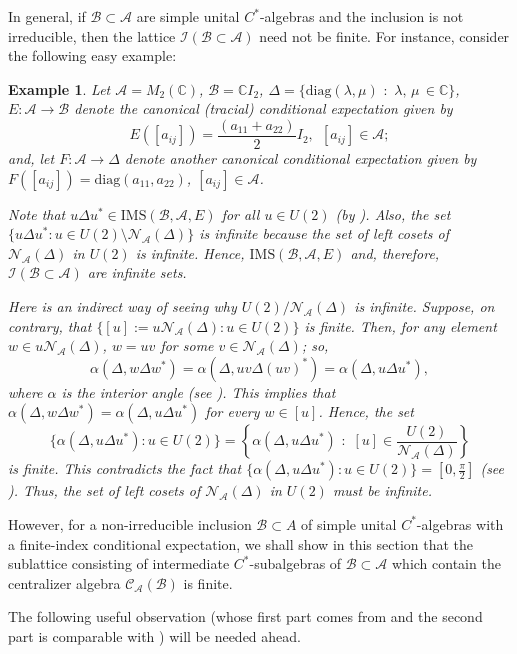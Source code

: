\documentclass{amsart}
\numberwithin{equation}{section}
\newcommand{\IMS}{\mathrm{IMS}}
\newcommand{\mcal}{\mathcal}
\newcommand{\mbb}{\mathbb}
\newcommand{\1}{\mathbf{1}}
\newcommand{\mA}{\mathcal{A}}
\newcommand{\mB}{\mathcal{B}}
\newcommand{\mC}{\mathcal{C}}
\newcommand{\mN}{\mathcal{N}}
\newtheorem{example}[theorem]{Example}
\begin{document}
In general, if $\mB \subset \mA$ are simple unital $C^*$-algebras and
the inclusion is not irreducible, then the lattice $\mathcal{I}(\mB
\subset \mA)$ need not be finite. For instance, consider the following
easy example:
\begin{example}
  Let $\mA=M_2(\mbb{C})$, $\mB=\mbb{C}I_2$, $\Delta=
  \{\mathrm{diag}(\lambda, \mu)\,\,:\,\,\lambda,\,\mu\,\in \mbb{C}\}$,
  $E: \mA\rightarrow \mB$ denote the canonical (tracial) conditional
  expectation given by
  \[
  E([a_{ij}])= \frac{(a_{11}+a_{22})}{2}I_2,\
  \ [a_{ij}]\in \mA;
  \]
  and, let $F: \mA \rightarrow
  \Delta$ denote another canonical conditional expectation given by
  $F([a_{ij}])= \mathrm{diag}(a_{11},a_{22})$, $[a_{ij}]\in \mA$.

  Note that $u\Delta
  u^*\in \IMS(\mB, \mA, E)$ for all $u \in U(2)$ (by \cite[Lemma
    2.8]{GS}). Also, the set $\{ u\Delta u^*: u\in U(2)\setminus
  \mcal{N}_{\mA}(\Delta)\}$ is infinite because the set of left cosets
  of $ \mcal{N}_{\mA}(\Delta)$ in $U(2)$ is infinite. Hence,
  $\IMS(\mB, \mA, E)$ and, therefore, $\mathcal{I}(\mB \subset \mA)$
  are infinite sets.

  Here is an indirect way of seeing why $U(2)/\mN_{\mA}(\Delta)$ is
  infinite. Suppose, on contrary, that $ \{[u]:=
  u\mcal{N}_{\mA}(\Delta) :  u\in U(2)\} $ is finite. Then, for
  any element $w\in u\mcal{N}_{\mA}(\Delta)$, $w=uv$ for some $v\in
  \mcal{N}_{\mA}(\Delta)$; so,
$$ \alpha(\Delta, w\Delta w^*)= \alpha(\Delta, uv\Delta
(uv)^*)=\alpha(\Delta, u\Delta u^*),
$$
where $\alpha$ is the interior angle (see \cite{GS}). This implies that \( \alpha(\Delta, w\Delta
w^*)=\alpha(\Delta, u\Delta u^*)  \)  for every $w\in [u]$. Hence, the set
\[\{ \alpha( \Delta, u \Delta u^*) :u \in U(2)\} = \left\{\alpha(\Delta,u\Delta
u^*)\,\,:\,\, [u]\in \frac{U(2)}{\mcal{N}_{\mA}(\Delta)}\right\}
\]
is finite. This contradicts the fact that $\{ \alpha( \Delta, u \Delta
u^*) :u \in U(2)\} = [0, \frac{\pi}{2}]$ (see \cite[Corollary
  4.6]{GS}). Thus, the set of left cosets of $\mN_{\mA}(\Delta)$ in
$U(2)$ must be infinite.
\end{example}


However, for a non-irreducible inclusion $\mB \subset
A$ of simple unital $C^*$-algebras with a finite-index conditional
expectation, we shall show in this section that the sublattice
consisting of intermediate $C^*$-subalgebras of $\mB \subset \mA$ which
contain  the centralizer algebra $\mC_{\mA}(\mB)$ is finite.


The following useful observation (whose first part comes from \cite{I}
and the second part is comparable with \cite[Proposition 2.7 (1,
  2)]{GS}) will be needed ahead.
\end{document}
